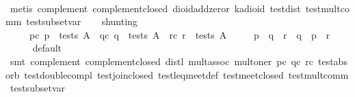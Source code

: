 \begin{isabellebody}
%
\isadelimproof
\ \ \ \ %
\endisadelimproof
%
\isatagproof
{}\isamarkupfalse%
\ {}metis\ complement{}\ complement{}closed\ dioid{}add{}zeror\ ka{}dioid\ test{}dist{}\ test{}mult{}comm\ test{}subset{}var{}%
\endisatagproof
{\isafoldproof}%
%
\isadelimproof
\isanewline
%
\endisadelimproof
\isanewline
\ \ \isamarkupfalse%
\ shunting{}\isanewline
\ \ \ \ \ pc{}\ {}p\ {}\ tests\ A{}\ \ qc{}\ {}q\ {}\ tests\ A{}\ \ rc{}\ {}r\ {}\ tests\ A{}\isanewline
\ \ \ \ \ {}p\ {}\ q\ {}\ r\ {}\ q\ {}\ {}p\ {}\ r{}\isanewline
%
\isadelimproof
\ \ \ \ %
\endisadelimproof
%
\isatagproof
{}\isamarkupfalse%
\ default\isanewline
\ \ \ \ \isamarkupfalse%
\ {}smt\ complement{}\ complement{}closed\ distl\ mult{}assoc\ mult{}oner\ pc\ qc\ rc\ test{}absorb{}\ test{}double{}compl\ test{}join{}closed\ test{}leq{}meet{}def\ test{}meet{}closed\ test{}mult{}comm\ test{}subset{}var{}\isanewline

\end{isabellebody}
